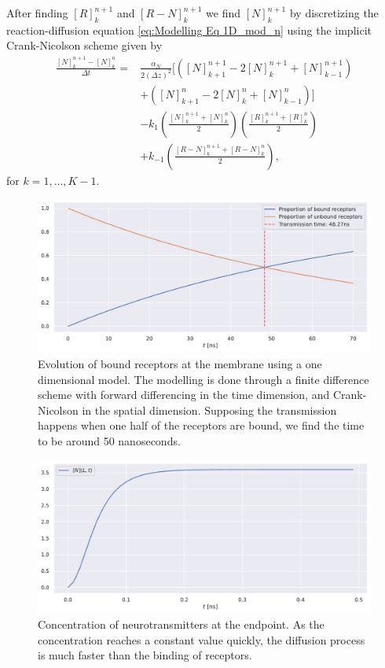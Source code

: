 \documentclass{article}
\begin{document}
After finding $[R]_k^{n+1}$ and $[R-N]_{k}^{n+1}$ we find $[N]_{k}^{n+1}$ by discretizing the reaction-diffusion equation \eqref{eq:Modelling Eq 1D_mod_n} using the implicit Crank-Nicolson scheme given by 
\begin{align}\label{eq:cn_1D}
        \frac{[N]_{k}^{n+1} - [N]_{k}^{n}}{\Delta t} =& \frac{\alpha_N}{2 (\Delta z)^2} [ \left( [N]_{k+1}^{n+1} - 2[N]_{k}^{n+1} + [N]_{k-1}^{n+1} \right) \\
                                                     & +\left( [N]_{k+1}^{n} - 2 [N]_{k}^{n}+ [N]_{k-1}^{n} \right) ] \\
                                                     &- k_1 \left( \frac{[N]_{k}^{n+1} + [N]_k^n}{2} \right) \left( \frac{[R]_{k}^{n+1} + [R]_k^n}{2} \right) \\
                                                     &+k_{-1}\left( \frac{[R-N]_{k}^{n+1} + [R-N]_k^n}{2} \right),
\end{align}
for $k = 1, \hdots, K - 1$. 
\begin{figure}[h]
        \centering
        \includegraphics[width=0.5\linewidth]{./code/figures/receptors.pdf}
        \caption{Evolution of bound receptors at the membrane using a one dimensional model. 
                The modelling is done through a finite difference scheme with forward differencing in the time dimension, and Crank-Nicolson in the spatial dimension. 
                Supposing the transmission happens when one half of the receptors are bound, we find the time to be around 50 nanoseconds.
        }
        \label{fig:receptors}
\end{figure}
\begin{figure}[h]
        \centering
        \includegraphics[width=0.5\linewidth]{./code/figures/neurotransmitters.pdf}
        \caption{Concentration of neurotransmitters at the endpoint.
        As the concentration reaches a constant value quickly, the diffusion process is much faster than the binding of receptors.}
        \label{fig:neurotrans}
\end{figure}
\end{document}
